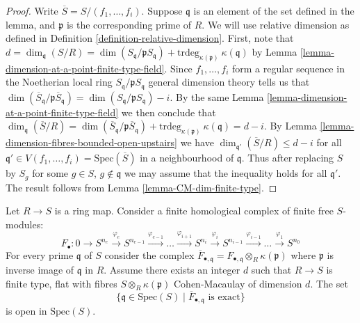 \begin{proof}
Write $\overline{S} = S/(f_1, \ldots, f_i)$.
Suppose $\mathfrak q$ is an element of the set defined in the
lemma, and $\mathfrak p$ is the corresponding prime of $R$.
We will use relative dimension as defined in
Definition \ref{definition-relative-dimension}.
First, note that $d = \dim_{\mathfrak q}(S/R) =
\dim(S_{\mathfrak q}/\mathfrak pS_{\mathfrak q}) +
\text{trdeg}_{\kappa(\mathfrak p)}\ \kappa(\mathfrak q)$
by Lemma \ref{lemma-dimension-at-a-point-finite-type-field}.
Since $f_1, \ldots, f_i$ form a regular sequence in the
Noetherian local ring $S_{\mathfrak q}/\mathfrak pS_{\mathfrak q}$
general dimension theory tells us that
$\dim(\overline{S}_{\mathfrak q}/\mathfrak p\overline{S}_{\mathfrak q})
= \dim(S_{\mathfrak q}/\mathfrak pS_{\mathfrak q}) - i$.
By the same Lemma \ref{lemma-dimension-at-a-point-finite-type-field}
we then conclude that $\dim_{\mathfrak q}(\overline{S}/R)
= \dim(\overline{S}_{\mathfrak q}/\mathfrak p\overline{S}_{\mathfrak q}) +
\text{trdeg}_{\kappa(\mathfrak p)}\ \kappa(\mathfrak q)
= d - i$. By Lemma
\ref{lemma-dimension-fibres-bounded-open-upstairs}
we have $\dim_{\mathfrak q'}(\overline{S}/R) \leq d - i$
for all $\mathfrak q' \in V(f_1, \ldots, f_i) = \text{Spec}(\overline{S})$
in a neighbourhood of $\mathfrak q$. Thus after replacing
$S$ by $S_g$ for some $g \in S$, $g \not \in \mathfrak q$
we may assume that the inequality holds for all
$\mathfrak q'$. The result follows from Lemma
\ref{lemma-CM-dim-finite-type}.
\end{proof}

\begin{lemma}
\label{lemma-exact-on-fibres-open}
Let $R \to S$ is a ring map.
Consider a finite homological complex of
finite free $S$-modules:
$$
F_{\bullet} :
0
\to
S^{n_e}
\xrightarrow{\varphi_e}
S^{n_{e-1}}
\xrightarrow{\varphi_{e-1}}
\ldots
\xrightarrow{\varphi_{i + 1}}
S^{n_i}
\xrightarrow{\varphi_i}
S^{n_{i-1}}
\xrightarrow{\varphi_{i-1}}
\ldots
\xrightarrow{\varphi_1}
S^{n_0}
$$
For every prime $\mathfrak q$ of $S$ consider the
complex $\overline{F}_{\bullet, \mathfrak q} =
F_{\bullet, \mathfrak q} \otimes_R \kappa(\mathfrak p)$
where $\mathfrak p$ is inverse image of $\mathfrak q$ in $R$.
Assume there exists an integer $d$ such
that $R \to S$ is finite type, flat
with fibres $S \otimes_R \kappa(\mathfrak p)$
Cohen-Macaulay of dimension $d$.
The set
$$
\{\mathfrak q \in \text{Spec}(S) \mid
\overline{F}_{\bullet, \mathfrak q}\text{ is exact}\}
$$
is open in $\text{Spec}(S)$.
\end{lemma}

